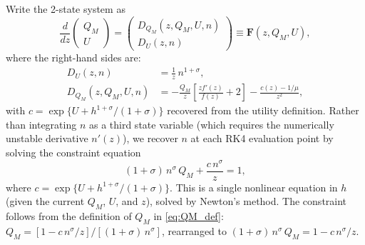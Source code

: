 \documentclass[12pt,a4paper]{article}
\theoremstyle{definition}
\theoremstyle{plain}
\theoremstyle{remark}
\begin{document}
Write the 2-state system as
\[
  \frac{d}{dz}\begin{pmatrix} Q_M \\ U \end{pmatrix} = \begin{pmatrix} D_{Q_M}(z, Q_M, U, n) \\ D_U(z, n) \end{pmatrix} \equiv \mathbf{F}(z, Q_M, U),
\]
where the right-hand sides are:
\begin{align*}
  D_U(z, n) &= \frac{1}{z}\,n^{1+\sigma}, \\
  D_{Q_M}(z, Q_M, U, n) &= -\frac{Q_M}{z}\!\left[\frac{z f'(z)}{f(z)} + 2\right] - \frac{c(z) - 1/\mu}{z^2},
\end{align*}
with $c = \exp\{U + h^{1+\sigma}/(1+\sigma)\}$ recovered from the utility definition. Rather than integrating $n$ as a third state variable (which requires the numerically unstable derivative $n'(z)$), we recover $n$ at each RK4 evaluation point by solving the constraint equation
\begin{equation}
  (1+\sigma)\,n^{\sigma}\,Q_M + \frac{c\,n^{\sigma}}{z} = 1,
  \label{eq:h_constraint}
\end{equation}
where $c = \exp\{U + h^{1+\sigma}/(1+\sigma)\}$. This is a single nonlinear equation in $h$ (given the current $Q_M$, $U$, and $z$), solved by Newton's method. The constraint follows from the definition of $Q_M$ in \eqref{eq:QM_def}: $Q_M = [1 - c\,n^{\sigma}/z]/[(1+\sigma)\,n^{\sigma}]$, rearranged to $(1+\sigma)\,n^{\sigma}\,Q_M = 1 - c\,n^{\sigma}/z$.
\end{document}

